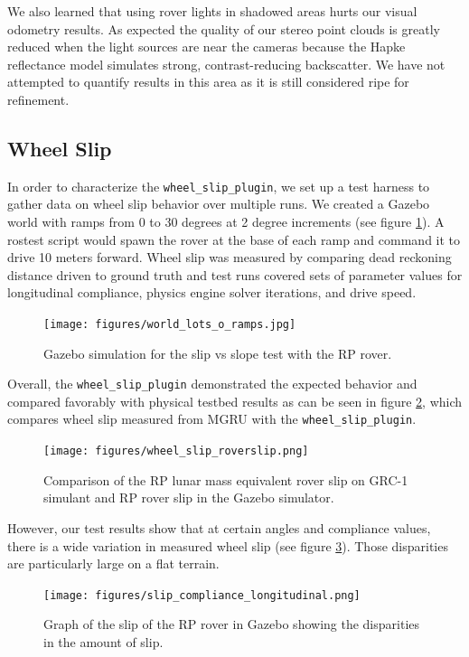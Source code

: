 \documentclass[twocolumn,letterpaper]{IEEEAerospaceCLS}  %
\begin{document}
We also learned that using rover lights in shadowed areas hurts our visual odometry results. 
As expected the quality of our stereo point clouds is greatly reduced when the light sources are near the cameras because the Hapke reflectance model simulates strong, contrast-reducing backscatter. 
We have not attempted to quantify results in this area as it is still considered ripe for refinement.

\subsection{Wheel Slip}
In order to characterize the \texttt{wheel\_slip\_plugin}, we set up a test harness to gather data on wheel slip behavior over multiple runs. 
We created a Gazebo world with ramps from 0 to 30 degrees at 2 degree increments (see figure \ref{fig:simulationramps}). 
A rostest script would spawn the rover at the base of each ramp and command it to drive 10 meters forward.
Wheel slip was measured by comparing dead reckoning distance driven to ground truth and test runs covered sets of parameter values for longitudinal compliance, physics engine solver iterations, and drive speed. 
\begin{figure}[h!]
	\texttt{[image: figures/world\_lots\_o\_ramps.jpg]}
   	\caption{Gazebo simulation for the slip vs slope test with the RP rover.}
    \label{fig:simulationramps}
\end{figure}
Overall, the \texttt{wheel\_slip\_plugin} demonstrated the expected behavior and compared favorably with physical testbed results as can be seen in figure \ref{fig:wheelsliptuningchart}, which compares wheel slip measured from MGRU with the  \texttt{wheel\_slip\_plugin}. 
\begin{figure}[h!]
	\texttt{[image: figures/wheel\_slip\_roverslip.png]}
   	\caption{Comparison of the RP lunar mass equivalent rover slip on GRC-1 simulant and RP rover slip in the Gazebo simulator.}
    \label{fig:wheelsliptuningchart}
\end{figure}

However, our test results show that at certain angles and compliance values, there is a wide variation in measured wheel slip (see figure \ref{fig:slipdisparities}). Those disparities are particularly large on a flat terrain.
\begin{figure}[h!]
	\texttt{[image: figures/slip\_compliance\_longitudinal.png]}
   	\caption{Graph of the slip of the RP rover in Gazebo showing the disparities in the amount of slip.}
    \label{fig:slipdisparities}
\end{figure}
\end{document}
